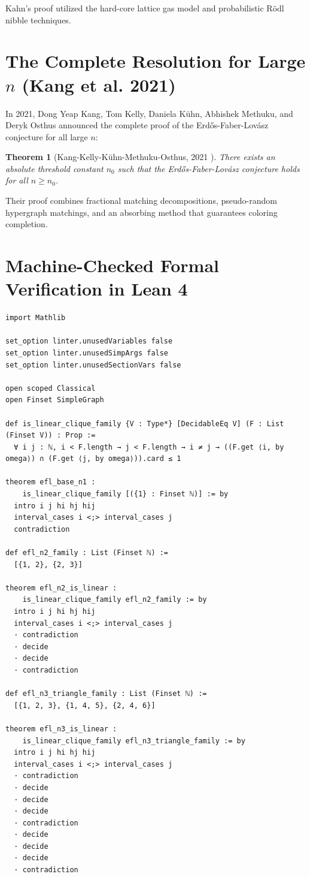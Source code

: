 \documentclass[11pt,a4paper]{article}
\newtheorem{theorem}{Theorem}[section]
\theoremstyle{definition}
\begin{document}
Kahn's proof utilized the hard-core lattice gas model and probabilistic Rödl nibble techniques.

\section{The Complete Resolution for Large $n$ (Kang et al. 2021)}

In 2021, Dong Yeap Kang, Tom Kelly, Daniela K\"uhn, Abhishek Methuku, and Deryk Osthus \cite{kang2021efl} announced the complete proof of the Erd\H{o}s-Faber-Lov\'asz conjecture for all large $n$:

\begin{theorem}[Kang-Kelly-K\"uhn-Methuku-Osthus, 2021 \cite{kang2021efl}]\label{thm:kkkmo}
There exists an absolute threshold constant $n_0$ such that the Erd\H{o}s-Faber-Lov\'asz conjecture holds for all $n \ge n_0$.
\end{theorem}

Their proof combines fractional matching decompositions, pseudo-random hypergraph matchings, and an absorbing method that guarantees coloring completion.

\section{Machine-Checked Formal Verification in Lean 4}

\begin{lstlisting}[caption={Formal Lean 4 Implementation of Linear Clique Families and Base EFL Cases}]
import Mathlib

set_option linter.unusedVariables false
set_option linter.unusedSimpArgs false
set_option linter.unusedSectionVars false

open scoped Classical
open Finset SimpleGraph

def is_linear_clique_family {V : Type*} [DecidableEq V] (F : List (Finset V)) : Prop :=
  ∀ i j : ℕ, i < F.length → j < F.length → i ≠ j → ((F.get ⟨i, by omega⟩) ∩ (F.get ⟨j, by omega⟩)).card ≤ 1

theorem efl_base_n1 :
    is_linear_clique_family [({1} : Finset ℕ)] := by
  intro i j hi hj hij
  interval_cases i <;> interval_cases j
  contradiction

def efl_n2_family : List (Finset ℕ) :=
  [{1, 2}, {2, 3}]

theorem efl_n2_is_linear :
    is_linear_clique_family efl_n2_family := by
  intro i j hi hj hij
  interval_cases i <;> interval_cases j
  · contradiction
  · decide
  · decide
  · contradiction

def efl_n3_triangle_family : List (Finset ℕ) :=
  [{1, 2, 3}, {1, 4, 5}, {2, 4, 6}]

theorem efl_n3_is_linear :
    is_linear_clique_family efl_n3_triangle_family := by
  intro i j hi hj hij
  interval_cases i <;> interval_cases j
  · contradiction
  · decide
  · decide
  · decide
  · contradiction
  · decide
  · decide
  · decide
  · contradiction
\end{lstlisting}
\end{document}
